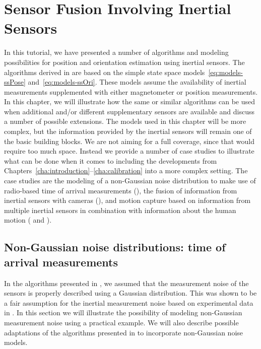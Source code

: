 \chapter{Sensor Fusion Involving Inertial Sensors}
\label{cha:applications} 
In this tutorial, we have presented a number of algorithms and modeling possibilities for position and orientation estimation using inertial sensors. The algorithms derived in  are based on the simple state space models~\eqref{eq:models-ssPose} and~\eqref{eq:models-ssOri}. These models assume the availability of inertial measurements supplemented with either magnetometer or position measurements. In this chapter, we will illustrate how the same or similar algorithms can be used when additional and/or different supplementary sensors are available and discuss a number of possible extensions. The models used in this chapter will be more complex, but the information provided by the inertial sensors will remain one of the basic building blocks. We are not aiming for a full coverage, since that would require too much space. Instead we provide a number of case studies to illustrate what can be done when it comes to including the developments from Chapters~\ref{cha:introduction}--\ref{cha:calibration} into a more complex setting. The case studies are the modeling of a non-Gaussian noise distribution to make use of radio-based time of arrival measurements (), the fusion of information from inertial sensors with cameras (), and motion capture based on information from multiple inertial sensors in combination with information about the human motion ( and ).

\section{Non-Gaussian noise distributions: time of arrival measurements}
\label{sec:appl-uwb}
In the algorithms presented in , we assumed that the measurement noise of the sensors is properly described using a Gaussian distribution. This was shown to be a fair assumption for the inertial measurement noise based on experimental data in . In this section we will illustrate the possibility of modeling non-Gaussian measurement noise using a practical example. We will also describe possible adaptations of the algorithms presented in  to incorporate non-Gaussian noise models. 

